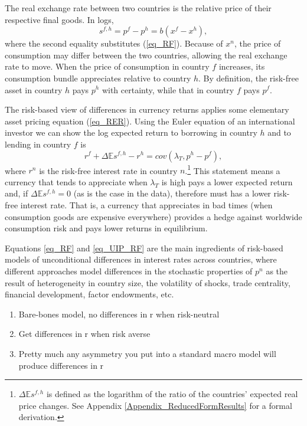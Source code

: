 \documentclass[12pt,letter]{article}
\theoremstyle{break} \theorembodyfont{\normalfont\itshape}
\theoremstyle{break}
\theoremstyle{break} \theorembodyfont{\normalfont\itshape}
\theoremstyle{break} \theorembodyfont{\normalfont\itshape}
\begin{document}
The real exchange rate between two countries is the relative price of
their respective final goods. In logs,
\begin{equation}
  s^{f,h}=p^{f}-p^{h}=b(x^{f}-x^{h}),
\end{equation}\label{eq_RER}
where the second equality substitutes (\ref{eq_RF}).
Because of $x^{n}$, the price of consumption may differ between the two countries, allowing the real exchange rate to move. When the price of consumption in country $f$ increases, its consumption bundle appreciates relative to country $h$. By definition, the risk-free asset in country $h$ pays $p^h$ with certainty, while that in country $f$ pays $p^f$. 

The risk-based view of differences in currency returns applies some
elementary asset pricing equation (\ref{eq_RER}). Using the Euler equation
of an international investor we can show the log expected return to
borrowing in country $h$ and to lending in country $f$ is
\begin{equation}
  r^{f} + \Delta \mathbb{E} s^{f,h} - r^{h} =cov\left( \lambda _{T},p^{h}-p^{f}\right),
  \label{eq_UIP_RF}
\end{equation}%
where $r^{n}$ is the risk-free interest rate in country $n$.\footnote{$\Delta\mathbb{E}s^{f,h}$ is defined as the
  logarithm of the ratio of the countries' expected real price
  changes. See Appendix \ref{Appendix_ReducedFormResults} for a formal
  derivation.} This statement means a currency that tends to
appreciate when $\lambda_T$ is high pays a lower expected return and,
if $\Delta \mathbb{E} s^{f,h}=0$ (as is the case in the data), therefore must has a lower risk-free interest
rate. That is, a currency that appreciates in bad times (when
consumption goods are expensive everywhere) provides a
hedge against worldwide consumption risk and pays lower returns in
equilibrium.

Equations \eqref{eq_RF} and \eqref{eq_UIP_RF} are the main ingredients
of risk-based models of unconditional differences in interest rates
across countries, where different approaches model differences in the
stochastic properties of \(p^n\) as the result of heterogeneity in
country size, the volatility of shocks, trade centrality, financial
development, factor endowments, etc. 




\begin{enumerate}
\item Bare-bones model, no differences in r when risk-neutral
\item Get differences in r when risk averse
\item Pretty much any asymmetry you put into a standard macro model
  will produce differences in r
\end{enumerate}
\end{document}
